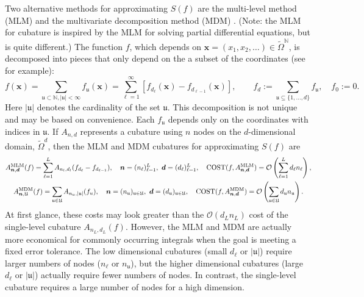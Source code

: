 \documentclass[11pt]{NSFamsart}
\DeclareMathOperator{\cost}{COST}
\newcommand{\naturals}{{\mathbb{N}}}
\newcommand{\fu}{\mathfrak{u}}
\newcommand{\tOmega}{\widetilde{\Omega}}
\newcommand{\bd}{{\boldsymbol{d}}}
\newcommand{\bx}{{\boldsymbol{x}}}
\newcommand{\bn}{{\boldsymbol{n}}}
\newcommand{\fU}{\mathfrak{U}}
\def\abs#1{\ensuremath{\left \lvert #1 \right \rvert}}
\newcommand{\Order}{\mathcal{O}}
\begin{document}
Two alternative methods for approximating $S(f)$ are the multi-level method (MLM) \cite{Gil15a} 
and the 
multivariate 
decomposition method (MDM) \cite{Was13b}.  (Note: the MLM for cubature is inspired by the MLM 
for solving partial differential equations, but is quite different.) The function $f$, which depends on 
$\bx=(x_1, x_2, 
\ldots) \in 
\tOmega^\naturals$, 
is decomposed into pieces that only depend on the a subset of the coordinates (see 
\cite{WanHic00b} for example):  
\begin{equation*}
f(\bx) = \sum_{\fu \subset \naturals, \abs{\fu} < \infty} f_{\fu}(\bx) = \sum_{\ell 
=1}^\infty [f_{d_\ell}(\bx) - f_{d_{\ell-1}}(\bx)], \qquad  f_d:= \sum_{\fu \subseteq \{1, 
\ldots, d\}} f_\fu, \quad f_0:= 0.
\end{equation*}
Here $\abs{\fu}$ denotes the cardinality of the set $\fu$.  This decomposition is not unique and may 
be based on convenience.  Each $f_{\fu}$ depends 
only 
on the coordinates with indices in $\fu$.  If $A_{n,d}$ represents a cubature 
using $n$ nodes on the $d$-dimensional domain, $\tOmega^d$, then the MLM and MDM cubatures 
for 
approximating $S(f)$ are \cite{Gil15a, Was13b}
\begin{gather*}
A^{\textup{MLM}}_{\bn,\bd}(f) = \sum_{\ell=1}^L A_{n_l,d_l}(f_{d_\ell} - f_{d_{\ell-1}}), \quad \bn = 
(n_\ell)_{\ell = 1}^L, \ \bd = 
(d_\ell)_{\ell = 1}^L, \quad \cost(f,A^{\textup{MLM}}_{\bn,\bd}) = \Order\left (\sum_{\ell=1}^L d_\ell 
n_\ell \right), \\
A^{\textup{MDM}}_{\bn,\fU}(f) = \sum_{\fu \in \fU} A_{n_{\fu},\abs{\fu}}(f_{u}), \quad \bn = 
(n_\fu)_{\fu \in \fU}, \ \bd = 
(d_\fu)_{\fu \in \fU}, \quad \cost(f,A^{\textup{MDM}}_{\bn,\bd}) = \Order\left (\sum_{\fu \in \fU} d_\fu 
n_\fu\right).
\end{gather*}
At first glance, these costs may look greater than the $\Order(d_L n_L)$ cost of the single-level 
cubature 
$A_{n_L,d_L}(f)$.  However, the MLM and MDM are actually more 
economical for commonly occurring integrals when the goal is meeting a fixed error tolerance.   The 
low dimensional cubatures (small $d_\ell$ or $\abs{\fu}$) require 
larger numbers of nodes ($n_\ell$ or $n_{\fu}$),  
but the higher dimensional cubatures (large $d_\ell$ or $\abs{\fu}$) actually require fewer numbers 
of nodes.  In contrast, the single-level cubature requires a large number of nodes for a high 
dimension.
\end{document}
